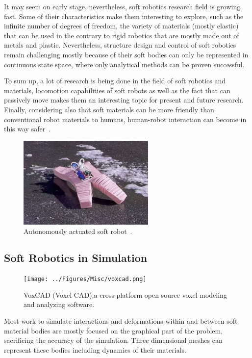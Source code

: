 It may seem on early stage, nevertheless, soft robotics research field is growing fast. Some of their characteristics make them interesting to explore, such as the infinite number of degrees of freedom, the variety of materials (mostly elastic) that can be used in the contrary to rigid robotics that are mostly made out of metals and plastic. Nevertheless, structure design and control of soft robotics remain challenging mostly because of their soft bodies can only be represented in continuous state space, where only analytical methods can be proven successful.

To sum up, a lot of research is being done in the field of soft robotics and materials, locomotion capabilities of soft robots as well as the fact that can passively move makes them an interesting topic for present and future research. Finally, considering also that soft materials can be more friendly than conventional robot materials to humans, human-robot interaction can become in this way safer~\cite{sanan2011continuum}.


\begin{figure}[t!]
\centering
\includegraphics[width=0.6\textwidth]{../Figures/Misc/softbot.jpg}
\caption{Autonomously actuated soft robot~\cite{tolleyresilient}.}
\label{fig:softbot}
\end{figure}


\subsection{Soft Robotics in Simulation}


\begin{figure}[t!]
\centering
\texttt{[image: ../Figures/Misc/voxcad.png]}
\caption{VoxCAD (Voxel CAD),a cross-platform open source voxel modeling and analyzing software.}
\label{fig:VoxCAD}
\end{figure}

Most work to simulate interactions and deformations within and between soft material bodies are mostly focused on the graphical part of the problem, sacrificing the accuracy of the simulation. Three dimensional meshes can represent these bodies including dynamics of their materials. 


